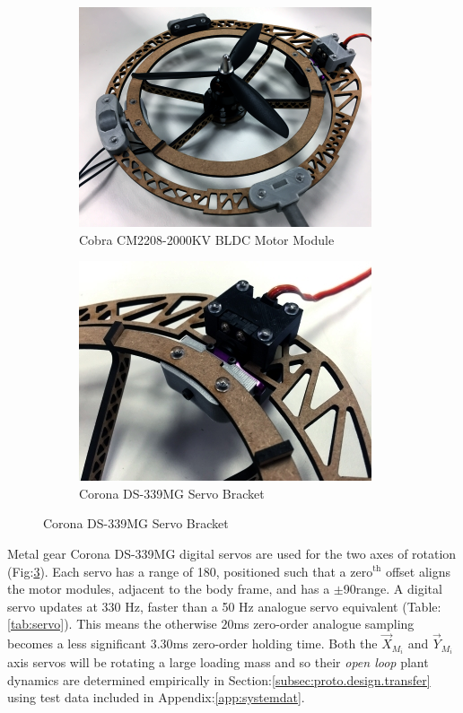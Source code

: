 \begin{figure}[htbp]
\centering
\begin{subfigure}{0.49\textwidth}
\includegraphics[width=\textwidth]{figs/motor-bldc}
\caption{Cobra CM2208-2000KV BLDC Motor Module}
\label{fig:bldc-motor}
\end{subfigure}
\begin{subfigure}{0.49\textwidth}
\includegraphics[width=\textwidth]{figs/motor-servo}
\caption{Corona DS-339MG Servo Bracket}
\label{fig:motor-servo}
\end{subfigure}
\end{figure}
\par
Metal gear Corona DS-339MG digital servos are used for the two axes of rotation (Fig:\ref{fig:motor-servo}). Each servo has a range of 180\textdegree , positioned such that a $\text{zero}^{\text{th}}$ offset aligns the motor modules, adjacent to the body frame, and has a $\pm $90\textdegree range. A digital servo updates at 330 Hz, faster than a 50 Hz analogue servo equivalent (Table:\ref{tab:servo}). This means the otherwise $20$ms zero-order analogue sampling becomes a less significant $3.30$ms zero-order holding time. Both the $\vec{X}_{M_i}$ and $\vec{Y}_{M_i}$ axis servos will be rotating a large loading mass and so their \emph{open loop} plant dynamics are determined empirically in Section:\ref{subsec:proto.design.transfer} using test data included in Appendix:\ref{app:systemdat}.
